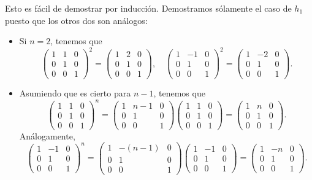\documentclass{article}
\begin{document}
\begin{sol}
\begin{description}
Esto es fácil de demostrar por inducción. Demostramos sólamente el caso de $\displaystyle h_{1} $ puesto que los otros dos son análogos:
\begin{itemize}
\item Si $\displaystyle n = 2 $, tenemos que 
	\[ \begin{pmatrix} 1 & 1 & 0 \\ 0 & 1 & 0 \\ 0 & 0 & 1 \end{pmatrix}^{2} = \begin{pmatrix} 1 & 2 & 0 \\ 0 & 1 & 0 \\ 0 & 0 & 1 \end{pmatrix}, \quad \begin{pmatrix} 1 & -1 & 0 \\ 0 & 1 & 0 \\ 0 & 0 & 1 \end{pmatrix}^{2} = \begin{pmatrix} 1 & -2 & 0 \\ 0 & 1 & 0 \\ 0 & 0 & 1 \end{pmatrix}	.\]
\item Asumiendo que es cierto para $\displaystyle n -1 $, tenemos que 
	\[\begin{pmatrix} 1 & 1 & 0 \\ 0 & 1 & 0 \\ 0 & 0 & 1 \end{pmatrix}^{n} = \begin{pmatrix} 1 & n-1 & 0 \\ 0 & 1 & 0 \\ 0 & 0 & 1 \end{pmatrix}\begin{pmatrix} 1 & 1 & 0 \\ 0 & 1 & 0 \\ 0 & 0 & 1 \end{pmatrix}=\begin{pmatrix} 1 & n & 0 \\ 0 & 1 & 0 \\ 0 & 0 & 1 \end{pmatrix} .\]
	Análogamente, 
	\[\begin{pmatrix} 1 & -1 & 0 \\ 0 & 1 & 0 \\ 0 & 0 & 1 \end{pmatrix}^{n}= \begin{pmatrix} 1 & -\left(n-1\right) & 0 \\ 0 & 1 & 0 \\ 0 & 0 & 1 \end{pmatrix}\begin{pmatrix} 1 & -1 & 0 \\ 0 & 1 & 0 \\ 0 & 0 & 1 \end{pmatrix}=\begin{pmatrix} 1 & -n & 0 \\ 0 & 1 & 0 \\ 0 & 0 & 1 \end{pmatrix} .\]

\end{itemize}
\end{description}
\end{sol}
\end{document}
